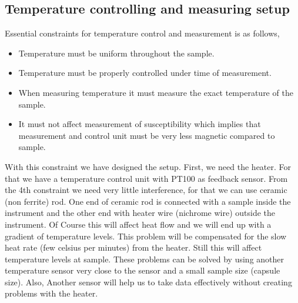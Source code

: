 \subsection{Temperature controlling and measuring setup}
Essential constraints for temperature control and measurement is as follows,
\begin{itemize}
\item Temperature must be uniform throughout the sample.\\

\item Temperature must be properly controlled under time of measurement.\\

\item When measuring temperature it must measure the exact temperature of the sample.\\

\item It must not affect measurement of susceptibility which implies that measurement and control unit must be very less magnetic compared to sample.
\end{itemize}

With this constraint we have designed the setup. First, we need the heater. For that we have a temperature control unit with PT100 as feedback sensor. From the 4th constraint we need very little interference, for that we can use ceramic (non ferrite) rod. One end of ceramic rod is connected with a sample inside the instrument and the other end with heater wire (nichrome wire) outside the instrument. Of Course this will affect heat flow and we will end up with a gradient of temperature levels. This problem will be compensated for the slow heat rate (few celsius per minutes) from the heater. Still this will affect temperature levels at sample. These problems can be solved by using another temperature sensor very close to the sensor and a small sample size (capsule size). Also, Another sensor will help us to take data effectively without creating problems with the heater.

